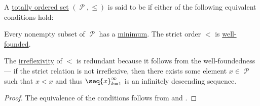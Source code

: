 \begin{definition}\label{def:well_ordered_set}
  A \hyperref[def:totally_ordered_set]{totally ordered set} \( (\mscrP, \leq) \) is said to be  if either of the following equivalent conditions hold:
  \begin{thmenum}
     Every nonempty subset of \( \mscrP \) has a \hyperref[def:partially_ordered_set_extremal_points/maximum_and_minimum]{minimum}.
     The strict order \( < \) is \hyperref[def:well_founded_relation]{well-founded}.
  \end{thmenum}

  The \hyperref[def:binary_relation/irreflexive]{irreflexivity} of \( < \) is redundant because it follows from the well-foundedness --- if the strict relation is not irreflexive, then there exists some element \( x \in \mscrP \) such that \( x < x \) and thus \( \seq{ x }_{k=1}^\infty \) is an infinitely descending sequence.
\end{definition}
\begin{proof}
  The equivalence of the conditions follows from  and .
\end{proof}

